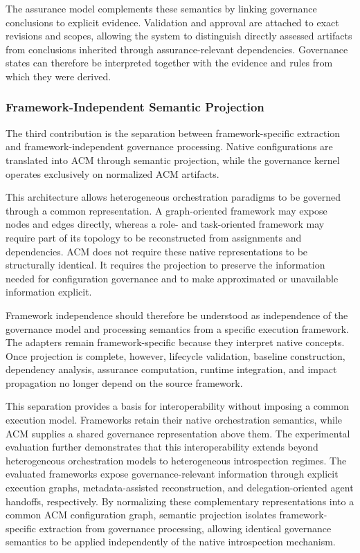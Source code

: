 \documentclass[10pt]{article}
\begin{document}
The assurance model complements these semantics by linking governance conclusions to explicit evidence. Validation and approval are attached to exact revisions and scopes, allowing the system to distinguish directly assessed artifacts from conclusions inherited through assurance-relevant dependencies. Governance states can therefore be interpreted together with the evidence and rules from which they were derived.

\subsubsection{Framework-Independent Semantic Projection}

The third contribution is the separation between framework-specific extraction and framework-independent governance processing. Native configurations are translated into ACM through semantic projection, while the governance kernel operates exclusively on normalized ACM artifacts.

This architecture allows heterogeneous orchestration paradigms to be governed through a common representation. A graph-oriented framework may expose nodes and edges directly, whereas a role- and task-oriented framework may require part of its topology to be reconstructed from assignments and dependencies. ACM does not require these native representations to be structurally identical. It requires the projection to preserve the information needed for configuration governance and to make approximated or unavailable information explicit.

Framework independence should therefore be understood as independence of the governance model and processing semantics from a specific execution framework. The adapters remain framework-specific because they interpret native concepts. Once projection is complete, however, lifecycle validation, baseline construction, dependency analysis, assurance computation, runtime integration, and impact propagation no longer depend on the source framework.

This separation provides a basis for interoperability without imposing a common execution model. Frameworks retain their native orchestration semantics, while ACM supplies a shared governance representation above them.
The experimental evaluation further demonstrates that this interoperability extends beyond heterogeneous orchestration models to heterogeneous introspection regimes. The evaluated frameworks expose governance-relevant information through explicit execution graphs, metadata-assisted reconstruction, and delegation-oriented agent handoffs, respectively. By normalizing these complementary representations into a common ACM configuration graph, semantic projection isolates framework-specific extraction from governance processing, allowing identical governance semantics to be applied independently of the native introspection mechanism.
\end{document}
